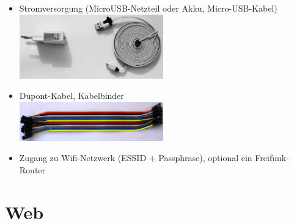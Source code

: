 \documentclass[
notumble,
]{leaflet}
\begin{document}
\begin{itemize}
\item Stromversorgung (MicroUSB-Netzteil oder Akku, Micro-USB-Kabel) \\\includegraphics[width=0.49\textwidth]{images/sensor/usb_plug_cable.jpg}
\item Dupont-Kabel, Kabelbinder \\\includegraphics[width=0.49\textwidth]{images/sensor/cable_dupont.jpg}
\item Zugang zu Wifi-Netzwerk (ESSID + Passphrase), optional ein Freifunk-Router
\end{itemize}

% 

\section{Web}
\end{document}
